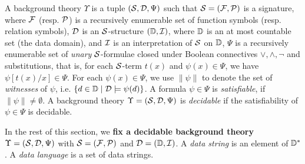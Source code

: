  
 \begin{definition}
A background theory $\Upsilon$ is a tuple $(\mathcal{S}, \mathcal{D}, \Psi)$ such that
$\mathcal{S}=({\mathcal{F}}, {\mathcal{P}})$ is a signature, where ${\mathcal{F}}$ (resp. ${\mathcal{P}}$) is a recursively enumerable set of function symbols (resp. relation symbols), 
%
$\mathcal{D}$ is an $\mathcal{S}$-structure $(\mathbb{D}, \mathcal{I})$, where $\mathbb{D}$ is an at most countable set (the data domain), and $\mathcal{I}$ is an interpretation of $\mathcal{S}$ on $\mathbb{D}$, 
%
$\Psi$ is a recursively enumerable set of \emph{unary} $\mathcal{S}$-formulae closed under Boolean connectives $\vee, \wedge, \neg$ and substitutions, that is, for each $\mathcal{S}$-term $t(x)$ and $\psi(x) \in \Psi$, we have $\psi[t(x)/x] \in \Psi$. 
%
For each $\psi(x) \in \Psi$, we use $\|\psi\|$ to denote the set of \emph{witnesses} of $\psi$, i.e. $\{d \in \mathbb{D} \mid  \mathcal{D} \models \psi(d)\}$. 
A formula $\psi \in \Psi$ is \emph{satisfiable}, if $\|\psi\| \neq \emptyset$. A background theory $\Upsilon = (\mathcal{S}, \mathcal{D}, \Psi)$ is \emph{decidable} if  the satisfiability of $\psi \in\Psi$ is decidable.
\end{definition}


In the rest of this section, we {\bf fix a decidable background theory} $\Upsilon=(\mathcal{S}, \mathcal{D}, \Psi)$ with $\mathcal{S}=({\mathcal{F}}, {\mathcal{P}})$ and $\mathcal{D} = (\mathbb{D}, \mathcal{I})$. 
A \emph{data string} is an element of $\mathbb{D}^*$. A \emph{data language} is a set of data strings.



